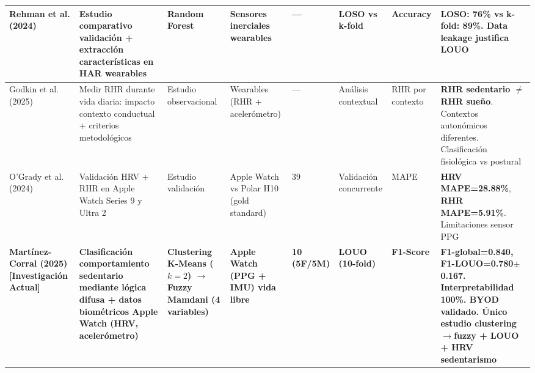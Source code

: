 \begin{longtable}{@{}p{1.8cm}p{2.2cm}p{1.5cm}p{1.3cm}p{0.8cm}p{1.2cm}p{1.8cm}p{1.5cm}@{}}
        \midrule
        
        Rehman et al. (2024) \cite{Rehman2024LOSO} & 
        Estudio comparativo validación + extracción características en HAR wearables & 
        Random Forest & 
        Sensores inerciales wearables & 
        --- & 
        LOSO vs k-fold & 
        Accuracy & 
        \textbf{LOSO: 76\%} vs \textbf{k-fold: 89\%}. Data leakage justifica LOUO \\
        
        \midrule
        
        Godkin et al. (2025) \cite{Godkin2025Context} & 
        Medir RHR durante vida diaria: impacto contexto conductual + criterios metodológicos & 
        Estudio observacional & 
        Wearables (RHR + acelerómetro) & 
        --- & 
        Análisis contextual & 
        RHR por contexto & 
        \textbf{RHR sedentario $\neq$ RHR sueño}. Contextos autonómicos diferentes. Clasificación fisiológica vs postural \\
        
        \midrule
        
        O'Grady et al. (2024) \cite{OGrady2024AppleWatch} & 
        Validación HRV + RHR en Apple Watch Series 9 y Ultra 2 & 
        Estudio validación & 
        Apple Watch vs Polar H10 (gold standard) & 
        39 & 
        Validación concurrente & 
        MAPE & 
        \textbf{HRV MAPE=28.88\%}, \textbf{RHR MAPE=5.91\%}. Limitaciones sensor PPG \\
        
        \midrule
        
        \textbf{Martínez-Corral (2025)} \newline \textbf{[Investigación Actual]} & 
        \textbf{Clasificación comportamiento sedentario mediante lógica difusa + datos biométricos Apple Watch (HRV, acelerómetro)} & 
        \textbf{Clustering K-Means ($k=2$) $\rightarrow$ Fuzzy Mamdani (4 variables)} & 
        \textbf{Apple Watch (PPG + IMU) vida libre} & 
        \textbf{10 (5F/5M)} & 
        \textbf{LOUO (10-fold)} & 
        \textbf{F1-Score} & 
        \textbf{F1-global=0.840, F1-LOUO=0.780$\pm$0.167. Interpretabilidad 100\%. BYOD validado. Único estudio clustering$\rightarrow$fuzzy + LOUO + HRV sedentarismo} \\
\end{longtable}

